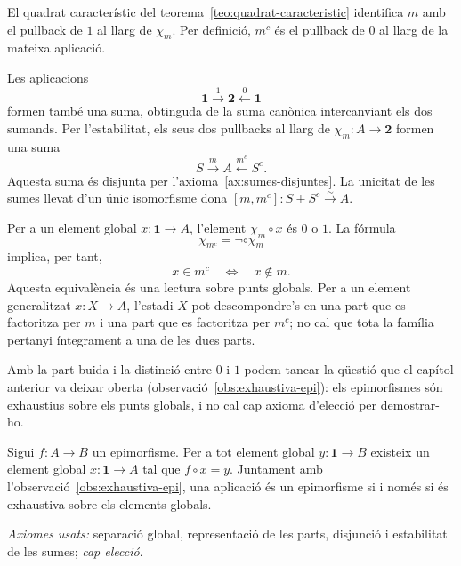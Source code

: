 \begin{prova}
El quadrat característic del
teorema~\ref{teo:quadrat-caracteristic} identifica \(m\) amb el
pullback de \(1\) al llarg de \(\chi_m\). Per definició, \(m^c\) és el
pullback de \(0\) al llarg de la mateixa aplicació.

Les aplicacions
\[
\mathbf1\xrightarrow{1}\mathbf2\xleftarrow{0}\mathbf1
\]
formen també una suma, obtinguda de la suma canònica intercanviant els
dos sumands. Per l'estabilitat, els seus dos pullbacks al llarg de
\(\chi_m:A\to\mathbf2\) formen una suma
\[
S\xrightarrow{m}A\xleftarrow{m^c}S^c.
\]
Aquesta suma és disjunta per l'axioma~\ref{ax:sumes-disjuntes}. La
unicitat de les sumes llevat d'un únic isomorfisme dona
\([m,m^c]:S+S^c\xrightarrow{\sim}A\).
\end{prova}

\begin{observacio}\label{obs:complement-classic}
Per a un element global \(x:\mathbf1\to A\), l'element
\(\chi_m\circ x\) és \(0\) o \(1\). La fórmula
\[
\chi_{m^c}=\neg\circ\chi_m
\]
implica, per tant,
\[
x\in m^c
\quad\Longleftrightarrow\quad
x\notin m.
\]
Aquesta equivalència és una lectura sobre punts globals. Per a un
element generalitzat \(x:X\to A\), l'estadi \(X\) pot descompondre's
en una part que es factoritza per \(m\) i una part que es factoritza
per \(m^c\); no cal que tota la família pertanyi íntegrament a una de
les dues parts.
\end{observacio}

Amb la part buida i la distinció entre \(0\) i \(1\) podem tancar la qüestió que el capítol anterior va deixar oberta (observació~\ref{obs:exhaustiva-epi}): els epimorfismes són exhaustius sobre els punts globals, i no cal cap axioma d'elecció per demostrar-ho.

\begin{proposicio}\label{prop:epi-exhaustiu-punts}
Sigui \(f\colon A\to B\) un epimorfisme. Per a tot element global \(y\colon\mathbf1\to B\) existeix un element global \(x\colon\mathbf1\to A\) tal que \(f\circ x=y\). Juntament amb l'observació~\ref{obs:exhaustiva-epi}, una aplicació és un epimorfisme si i només si és exhaustiva sobre els elements globals.\par
\emph{Axiomes usats:} separació global, representació de les parts, disjunció i estabilitat de les sumes; \emph{cap elecció}.
\end{proposicio}

